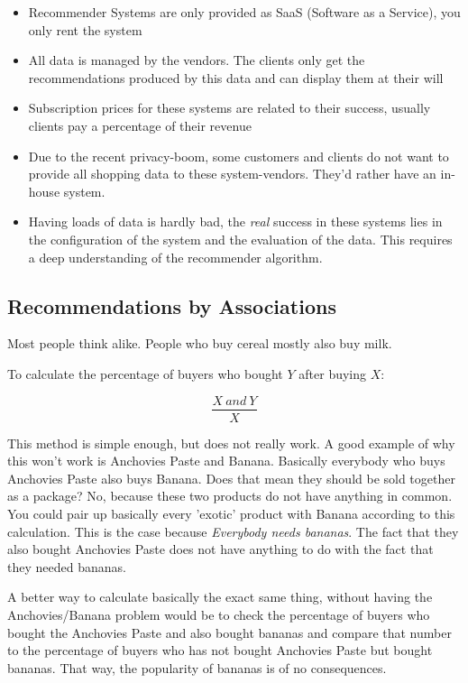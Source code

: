 \documentclass[11pt]{article}
\begin{document}
\begin{itemize}
    \item Recommender Systems are only provided as SaaS (Software as a Service), you only rent the system
    \item All data is managed by the vendors. The clients only get the recommendations produced by this data and can display them at their will
    \item Subscription prices for these systems are related to their success, usually clients pay a percentage of their revenue
    \item Due to the recent privacy-boom, some customers and clients do not want to provide all shopping data to these system-vendors. They'd rather have an in-house system.
    \item Having loads of data is hardly bad, the \textit{real} success in these systems lies in the configuration of the system and the evaluation of the data. This requires a deep understanding of the recommender algorithm.
\end{itemize}

\subsection{Recommendations by Associations}

Most people think alike. People who buy cereal mostly also buy milk.

To calculate the percentage of buyers who bought $Y$ after buying $X$:

\begin{equation}
    \frac{X\ and\ Y}{X}
\end{equation}

This method is simple enough, but does not really work. A good example of why this won't work is Anchovies Paste and Banana. Basically everybody who buys Anchovies Paste also buys Banana. Does that mean they should be sold together as a package? No, because these two products do not have anything in common. You could pair up basically every 'exotic' product with Banana according to this calculation. This is the case because \textit{Everybody needs bananas}. The fact that they also bought Anchovies Paste does not have anything to do with the fact that they needed bananas.

\vspace{10px}

A better way to calculate basically the exact same thing, without having the Anchovies/Banana problem would be to check the percentage of buyers who bought the Anchovies Paste and also bought bananas and compare that number to the percentage of buyers who has not bought Anchovies Paste but bought bananas. That way, the popularity of bananas is of no consequences.
\end{document}
